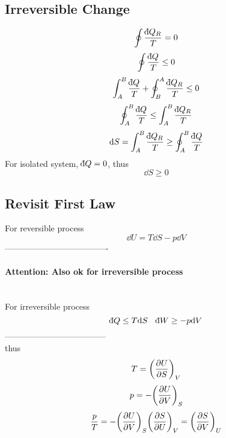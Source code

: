 \documentclass[UTF8]{ctexart} %
\newcommand{\dbar}{{\mathchar'26\mkern-11mu\mathrm{d}}}
\numberwithin{equation}{subsection}
\begin{document}
\subsection{Irreversible Change}
\begin{equation}\label{key}
\oint \dfrac{\dbar Q_R}{T} = 0
\end{equation}
\begin{equation}\label{key}
\oint \dfrac{\dbar Q}{T} \leq 0
\end{equation}
\begin{equation}\label{key}
\int_A^B \dfrac{\dbar Q}{T} + \oint_B^A \dfrac{\dbar Q_R}{T} \leq 0
\end{equation}
\begin{equation}\label{key}
\oint_A^B \dfrac{\dbar Q}{T} \leq \int_A^B \dfrac{\dbar Q_R}{T}
\end{equation}
\begin{equation}\label{key}
\dd S  = \int_A^B \dfrac{\dbar Q_R}{T} \geq \oint_A^B \dfrac{\dbar Q}{T}
\end{equation}
For isolated system, $\dbar Q = 0$, thus
\begin{equation}\label{key}
\dd S \geq 0
\end{equation}

\subsection{Revisit First Law}
For reversible process
\begin{equation}\label{key}
\dd U = T\dd S - p\dd V
\end{equation}
-------------------------------------~
\paragraph{Attention: Also ok for irreversible process}~\\
For irreversible process
\begin{equation}\label{key}
\dbar Q \leq T\dd S \quad \dbar W \geq -p\dd V
\end{equation}
------------------------------------~\\
thus 
\begin{equation}\label{T=pdvU}
T = \qty(\pdv{U}{S})_V
\end{equation}
\begin{equation}\label{key}
p = -\qty(\pdv{U}{V})_S
\end{equation}
\begin{equation}\label{key}
\dfrac{p}{T} = -\qty(\pdv{U}{V})_S\qty(\pdv{S}{U})_V = \qty(\pdv{S}{V})_U
\end{equation}
\end{document}
